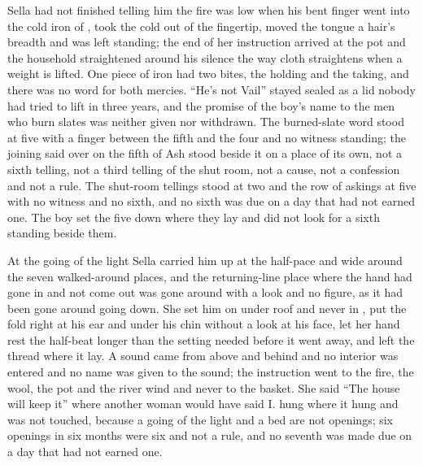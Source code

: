 Sella had not finished telling him the fire was low when his bent finger went into the cold iron of , took the cold out of the fingertip, moved the tongue a hair's breadth and was left standing; the end of her instruction arrived at the pot and the household straightened around his silence the way cloth straightens when a weight is lifted. One piece of iron had two bites, the holding and the taking, and there was no  word for both mercies. “He's not Vail” stayed sealed as a lid nobody had tried to lift in three years, and the promise of the boy's name to the men who burn slates was neither given nor withdrawn. The burned-slate word stood at five with a finger between the fifth and the four and no witness standing; the joining said over  on the fifth of Ash stood beside it on a place of its own, not a sixth telling, not a third telling of the shut room, not a cause, not a confession and not a rule. The shut-room tellings stood at two and the row of askings at five with no witness and no sixth, and no sixth was due on a day that had not earned one. The boy set the five down where they lay and did not look for a sixth standing beside them.

\scenebreak

At the going of the light Sella carried him up at the half-pace and wide around the seven walked-around places, and the returning-line place where the hand had gone in and not come out was gone around with a look and no figure, as it had been gone around going down. She set him on  under  roof and never in , put the fold right at his ear and under his chin without a look at his face, let her hand rest the half-beat longer than the setting needed before it went away, and left the thread where it lay. A sound came from above and behind and no interior was entered and no name was given to the sound; the instruction went to the fire, the wool, the pot and the river wind and never to the basket. She said “The house will keep it” where another woman would have said I.  hung where it hung and was not touched, because a going of the light and a bed are not openings; six openings in six months were six and not a rule, and no seventh was made due on a day that had not earned one.

